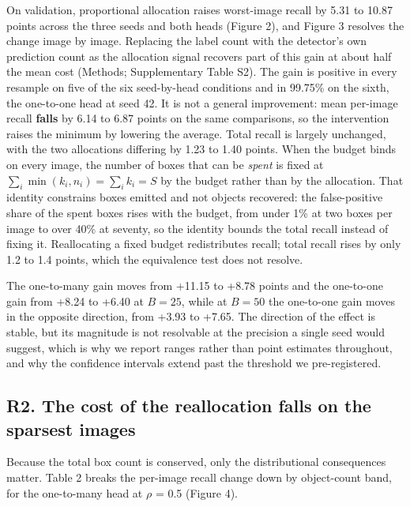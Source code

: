 \documentclass[sn-mathphys,Numbered]{sn-jnl}
\begin{document}
On validation, proportional allocation raises worst-image recall by 5.31 to 10.87 points across the three seeds and both heads (Figure 2), and Figure 3 resolves the change image by image. Replacing the label count with the detector's own prediction count as the allocation signal recovers part of this gain at about half the mean cost (Methods; Supplementary Table S2). The gain is positive in every resample on five of the six seed-by-head conditions and in 99.75\% on the sixth, the one-to-one head at seed 42. It is not a general improvement: mean per-image recall \textbf{falls} by 6.14 to 6.87 points on the same comparisons, so the intervention raises the minimum by lowering the average. Total recall is largely unchanged, with the two allocations differing by 1.23 to 1.40 points. When the budget binds on every image, the number of boxes that can be \textit{spent} is fixed at $\sum_i \min(k_i, n_i) = \sum_i k_i = S$ by the budget rather than by the allocation. That identity constrains boxes emitted and not objects recovered: the false-positive share of the spent boxes rises with the budget, from under 1\% at two boxes per image to over 40\% at seventy, so the identity bounds the total recall instead of fixing it. Reallocating a fixed budget redistributes recall; total recall rises by only 1.2 to 1.4 points, which the equivalence test does not resolve.

The one-to-many gain moves from +11.15 to +8.78 points and the one-to-one gain from +8.24 to +6.40 at $B = 25$, while at $B = 50$ the one-to-one gain moves in the opposite direction, from +3.93 to +7.65. The direction of the effect is stable, but its magnitude is not resolvable at the precision a single seed would suggest, which is why we report ranges rather than point estimates throughout, and why the confidence intervals extend past the threshold we pre-registered.

\subsection{R2. The cost of the reallocation falls on the sparsest images}

Because the total box count is conserved, only the distributional consequences matter. Table 2 breaks the per-image recall change down by object-count band, for the one-to-many head at $\rho$ = 0.5 (Figure 4).
\end{document}
